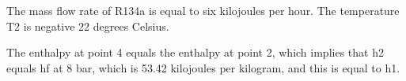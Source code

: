 The mass flow rate of R134a is equal to six kilojoules per hour. The temperature T2 is negative 22 degrees Celsius.

The enthalpy at point 4 equals the enthalpy at point 2, which implies that h2 equals hf at 8 bar, which is 53.42 kilojoules per kilogram, and this is equal to h1.